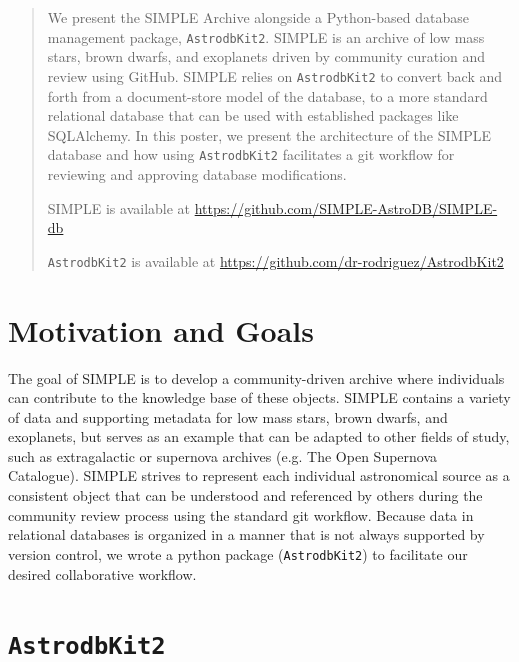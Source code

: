 \documentclass[11pt,twoside]{article}
\begin{document}

  
\begin{abstract}

We present the SIMPLE Archive alongside a Python-based database management package, \texttt{AstrodbKit2}. SIMPLE is an archive of low mass stars, brown dwarfs, and exoplanets driven by community curation and review using GitHub. SIMPLE relies on \texttt{AstrodbKit2} to convert back and forth from a document-store model of the database, to a more standard relational database that can be used with established packages like SQLAlchemy. In this poster, we present the architecture of the SIMPLE database and how using \texttt{AstrodbKit2} facilitates a git workflow for reviewing and approving database modifications.

SIMPLE is available at \url{https://github.com/SIMPLE-AstroDB/SIMPLE-db} 

\texttt{AstrodbKit2} is available at \url{https://github.com/dr-rodriguez/AstrodbKit2}
  
\end{abstract}

\section{Motivation and Goals}

The goal of SIMPLE is to develop a community-driven archive where individuals can contribute to the knowledge base of these objects. 
SIMPLE contains a variety of data and supporting metadata for low mass stars, brown dwarfs, and exoplanets, but serves as an example that can be adapted to other fields of study, such as extragalactic or supernova archives (e.g. The Open Supernova Catalogue). 
SIMPLE strives to represent each individual astronomical source as a consistent object that can be understood and referenced by others during the community review process using the standard git workflow. 
Because data in relational databases is organized in a manner that is not always supported by version control, we wrote a python package (\texttt{AstrodbKit2}) to facilitate our desired collaborative workflow.


\section{\texttt{AstrodbKit2}}
\end{document}
